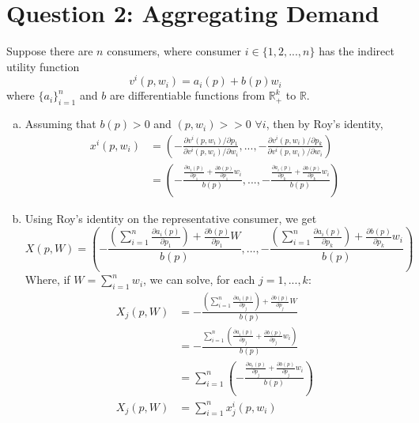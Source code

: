 \documentclass{article}
\newcommand{\R}{\mathbb{R}}
\begin{document}
\section*{Question 2: Aggregating Demand}
Suppose there are $n$ consumers, where consumer $i\in\{1,2,...,n\}$ has the indirect utility function 
\[
	v^i(p,w_i) = a_i(p) + b(p)w_i 
\]
where $\{a_i\}_{i=1}^n$ and $b$ are differentiable functions from $\R_+^k$ to $\R$.
\begin{enumerate}[(a)]
	\item Assuming that $b(p)>0$ and $(p,w_i)>>0$ $\forall i$, then by Roy's identity,
		\begin{align*}
			x^i(p,w_i) 	&= \left(-\frac{\partial v^i(p,w_i)/\partial p_1}{\partial v^i(p,w_i)/\partial w_i},...,
							-\frac{\partial v^i(p,w_i)/\partial p_k}{\partial v^i(p,w_i)/\partial w_i} \right)	\\
						&= \left(-\frac{\frac{\partial a_i(p)}{\partial p_1} + \frac{\partial b(p)}{\partial p_1}w_i}{b(p)},...,
							-\frac{\frac{\partial a_i(p)}{\partial p_k} + \frac{\partial b(p)}{\partial p_k}w_i}{b(p)} \right)
		\end{align*}
		
	\item Using Roy's identity on the representative consumer, we get
		\[
			X(p,W) = \left(-\frac{\left(\sum_{i=1}^n\frac{\partial a_i(p)}{\partial p_1}\right) + \frac{\partial b(p)}{\partial p_1}W}{b(p)},...,
							-\frac{\left(\sum_{i=1}^n\frac{\partial a_i(p)}{\partial p_k}\right) + \frac{\partial b(p)}{\partial p_k}w_i}{b(p)} \right)
		\]
		Where, if $W=\sum_{i=1}^n w_i$, we can solve, for each $j=1,...,k$:
		\begin{align*}
			X_j(p,W)	&= -\frac{\left(\sum_{i=1}^n\frac{\partial a_i(p)}{\partial p_j}\right) + \frac{\partial b(p)}{\partial p_j}W}{b(p)}	\\
						&= -\frac{\sum_{i=1}^n\left(\frac{\partial a_i(p)}{\partial p_j}+ \frac{\partial b(p)}{\partial p_j}w_i\right)}{b(p)}	\\
						&= \sum_{i=1}^n\left(-\frac{\frac{\partial a_i(p)}{\partial p_j}+ \frac{\partial b(p)}{\partial p_j}w_i}{b(p)}\right)	\\
			X_j(p,W)	&= \sum_{i=1}^n x^i_j(p,w_i)
		\end{align*}
		
\end{enumerate}

\end{document}

